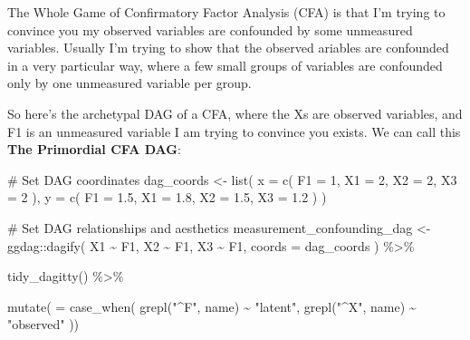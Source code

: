 \documentclass[
  letterpaper,
  DIV=11,
  numbers=noendperiod]{scrreprt}
\newenvironment{Shaded}{\begin{snugshade}}{\end{snugshade}}
\newcommand{\AttributeTok}[1]{\textcolor[rgb]{0.40,0.45,0.13}{#1}}
\newcommand{\CommentTok}[1]{\textcolor[rgb]{0.37,0.37,0.37}{#1}}
\newcommand{\DecValTok}[1]{\textcolor[rgb]{0.68,0.00,0.00}{#1}}
\newcommand{\FloatTok}[1]{\textcolor[rgb]{0.68,0.00,0.00}{#1}}
\newcommand{\FunctionTok}[1]{\textcolor[rgb]{0.28,0.35,0.67}{#1}}
\newcommand{\NormalTok}[1]{\textcolor[rgb]{0.00,0.23,0.31}{#1}}
\newcommand{\OtherTok}[1]{\textcolor[rgb]{0.00,0.23,0.31}{#1}}
\newcommand{\SpecialCharTok}[1]{\textcolor[rgb]{0.37,0.37,0.37}{#1}}
\newcommand{\StringTok}[1]{\textcolor[rgb]{0.13,0.47,0.30}{#1}}
\begin{document}
The Whole Game of Confirmatory Factor Analysis (CFA) is that I'm trying
to convince you my observed variables are confounded by some unmeasured
variables. Usually I'm trying to show that the observed ariables are
confounded in a very particular way, where a few small groups of
variables are confounded only by one unmeasured variable per group.

So here's the archetypal DAG of a CFA, where the Xs are observed
variables, and F1 is an unmeasured variable I am trying to convince you
exists. We can call this \textbf{The Primordial CFA DAG}:

\begin{Shaded}
\begin{Highlighting}[]
\CommentTok{\# Set DAG coordinates}
\NormalTok{dag\_coords }\OtherTok{\textless{}{-}} \FunctionTok{list}\NormalTok{(}
  \AttributeTok{x =} \FunctionTok{c}\NormalTok{(}
    \AttributeTok{F1 =} \DecValTok{1}\NormalTok{, }
    \AttributeTok{X1 =} \DecValTok{2}\NormalTok{,}
    \AttributeTok{X2 =} \DecValTok{2}\NormalTok{,}
    \AttributeTok{X3 =} \DecValTok{2}
\NormalTok{  ),}
  \AttributeTok{y =} \FunctionTok{c}\NormalTok{(}
    \AttributeTok{F1 =} \FloatTok{1.5}\NormalTok{,}
    \AttributeTok{X1 =} \FloatTok{1.8}\NormalTok{,}
    \AttributeTok{X2 =} \FloatTok{1.5}\NormalTok{,}
    \AttributeTok{X3 =} \FloatTok{1.2}
\NormalTok{  )}
\NormalTok{)}

\CommentTok{\# Set DAG relationships and aesthetics}
\NormalTok{measurement\_confounding\_dag }\OtherTok{\textless{}{-}}\NormalTok{ ggdag}\SpecialCharTok{::}\FunctionTok{dagify}\NormalTok{(}
\NormalTok{  X1 }\SpecialCharTok{\textasciitilde{}}\NormalTok{ F1,}
\NormalTok{  X2 }\SpecialCharTok{\textasciitilde{}}\NormalTok{ F1,}
\NormalTok{  X3 }\SpecialCharTok{\textasciitilde{}}\NormalTok{ F1,}
  \AttributeTok{coords =}\NormalTok{ dag\_coords}
\NormalTok{) }\SpecialCharTok{\%\textgreater{}\%} 
  
  \FunctionTok{tidy\_dagitty}\NormalTok{() }\SpecialCharTok{\%\textgreater{}\%} 
  
  \FunctionTok{mutate}\NormalTok{(}
    \StringTok{\textasciigrave{}}\AttributeTok{ }\StringTok{\textasciigrave{}} \OtherTok{=} \FunctionTok{case\_when}\NormalTok{(}
      \FunctionTok{grepl}\NormalTok{(}\StringTok{"\^{}F"}\NormalTok{, name) }\SpecialCharTok{\textasciitilde{}} \StringTok{"latent"}\NormalTok{,}
      \FunctionTok{grepl}\NormalTok{(}\StringTok{"\^{}X"}\NormalTok{, name) }\SpecialCharTok{\textasciitilde{}} \StringTok{"observed"}
\NormalTok{    ))}


\end{Highlighting}
\end{Shaded}
\end{document}
